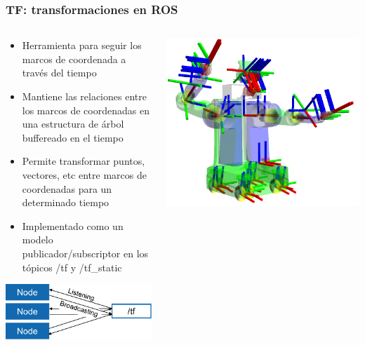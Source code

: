 \begin{frame}
	\frametitle{TF: transformaciones en ROS}
	
	\footnotesize
    
    
    \begin{columns}
		\begin{column}{0.5\textwidth}
			\begin{itemize}
			\item Herramienta para seguir los marcos de coordenada a través del tiempo
			\item Mantiene las relaciones entre los marcos de coordenadas en una estructura de árbol buffereado en el tiempo
			\item Permite transformar puntos, vectores, etc entre marcos de coordenadas para un determinado tiempo
			\item Implementado como un modelo publicador/subscriptor en los tópicos /tf y /tf\_static
			\end{itemize}
		
			\includegraphics[width=\columnwidth]{images/tf2_broadcaster_listener.pdf}
		\end{column}
		\begin{column}{0.5\textwidth}
			\includegraphics[width=\columnwidth]{images/tf2_tree_robot.png}
		\end{column}
	\end{columns}

\end{frame}

